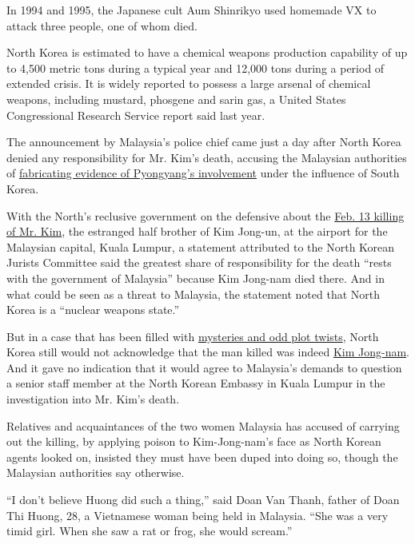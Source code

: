 In 1994 and 1995, the Japanese cult Aum Shinrikyo used homemade VX to
attack three people, one of whom died.

North Korea is estimated to have a chemical weapons production
capability of up to 4,500 metric tons during a typical year and 12,000
tons during a period of extended crisis. It is widely reported to
possess a large arsenal of chemical weapons, including mustard, phosgene
and sarin gas, a United States Congressional Research Service report
said last year.

The announcement by Malaysia's police chief came just a day after North
Korea denied any responsibility for Mr. Kim's death, accusing the
Malaysian authorities of
\href{https://www.nytimes.com/2017/02/23/world/asia/kim-jong-nam-assassination-north-korea-malaysia.html}{fabricating
evidence of Pyongyang's involvement} under the influence of South Korea.

With the North's reclusive government on the defensive about the
\href{https://www.nytimes.com/2017/02/14/world/asia/kim-jong-un-brother-killed-malaysia.html}{Feb.
13 killing of Mr. Kim}, the estranged half brother of Kim Jong-un, at
the airport for the Malaysian capital, Kuala Lumpur, a statement
attributed to the North Korean Jurists Committee said the greatest share
of responsibility for the death ``rests with the government of
Malaysia'' because Kim Jong-nam died there. And in what could be seen as
a threat to Malaysia, the statement noted that North Korea is a
``nuclear weapons state.''

But in a case that has been filled with
\href{https://www.nytimes.com/2017/02/22/world/asia/kim-jong-nam-assassination-korea-malaysia.html}{mysteries
and odd plot twists}, North Korea still would not acknowledge that the
man killed was indeed
\href{https://www.nytimes.com/2017/02/15/world/asia/kim-jong-nam-assassination-north-korea.html}{Kim
Jong-nam}. And it gave no indication that it would agree to Malaysia's
demands to question a senior staff member at the North Korean Embassy in
Kuala Lumpur in the investigation into Mr. Kim's death.

Relatives and acquaintances of the two women Malaysia has accused of
carrying out the killing, by applying poison to Kim-Jong-nam's face as
North Korean agents looked on, insisted they must have been duped into
doing so, though the Malaysian authorities say otherwise.

``I don't believe Huong did such a thing,'' said Doan Van Thanh, father
of Doan Thi Huong, 28, a Vietnamese woman being held in Malaysia. ``She
was a very timid girl. When she saw a rat or frog, she would scream.''

